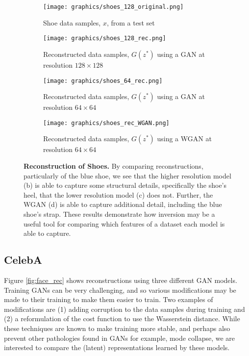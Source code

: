 \documentclass[journal]{IEEEtran}
\begin{document}
\begin{figure}[h]
    \begin{subfigure}{\columnwidth}
        \texttt{[image: graphics/shoes\_128\_original.png]}
        \caption{Shoe data samples, $x$, from a test set}
    \end{subfigure}
    \begin{subfigure}{\columnwidth}
        \texttt{[image: graphics/shoes\_128\_rec.png]}
        \caption{Reconstructed data samples, $G(z^*)$ using a GAN at resolution $128\times128$}
    \end{subfigure}
    \begin{subfigure}{\columnwidth}
        \texttt{[image: graphics/shoes\_64\_rec.png]}
        \caption{Reconstructed data samples, $G(z^*)$ using a GAN at resolution $64\times64$}
    \end{subfigure}
    \begin{subfigure}{\columnwidth}
        \texttt{[image: graphics/shoes\_rec\_WGAN.png]} %
        \caption{Reconstructed data samples, $G(z^*)$ using a WGAN at resolution $64\times64$}
    \end{subfigure}
    \caption{\textbf{Reconstruction of Shoes.} By comparing reconstructions, particularly of the blue shoe, we see that the higher resolution model (b) is able to capture some structural details, specifically the shoe's heel, that the lower resolution model (c) does not. Further, the WGAN (d) is able to capture additional detail, including the blue shoe's strap. These results demonstrate how inversion may be a useful tool for comparing which features of a dataset each model is able to capture.}
    \label{fig:shoes_rec}
\end{figure}


\subsection{CelebA}

Figure \ref{fig:face_rec} shows reconstructions using three different GAN models. Training GANs can be very challenging, and so various modifications may be made to their training to make them easier to train. Two examples of modifications are (1) adding corruption to the data samples during training \cite{arjovsky2017towards} and (2) a reformulation of the cost function to use the Wasserstein distance. While these techniques are known to make training more stable, and perhaps also prevent other pathologies found in GANs for example, mode collapse, we are interested to compare the (latent) representations learned by these models.
\end{document}
